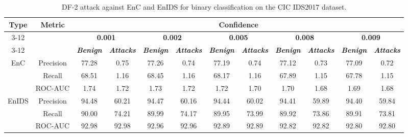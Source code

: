 \documentclass[conference]{IEEEtran}
\begin{document}
	\begin{table}[H]
		\caption{DF-2 attack against EnC and EnIDS for binary classification on the CIC IDS2017 dataset.}
		\small
		\setlength{\tabcolsep}{1pt}
		\centering
		\label{tab:cic_bin_df}
		
		\begin{tabular}{|c|c|c|c|c|c|c|c|c|c|c|c|}
			\hline
			\multirow{4}{*}{\textbf{Type}} & \multirow{4}{*}{\textbf{Metric}}& \multicolumn{10}{c|}{\textbf{Confidence}} \\
			\cline{3-12}
			&  & \multicolumn{2}{c|}{\textbf{0.001}} & \multicolumn{2}{c|}{\textbf{0.002}} & \multicolumn{2}{c|}{\textbf{0.005}} & \multicolumn{2}{c|}{\textbf{0.008}} & \multicolumn{2}{c|}{\textbf{0.009}}   \\
			\cline{3-12}
			&  &  \textbf{\textsl{Benign}} & \textbf{\textsl{Attacks}} & \textbf{\textsl{Benign}} & \textbf{\textsl{Attacks}} & \textbf{\textsl{Benign}} & \textbf{\textsl{Attacks}} & \textbf{\textsl{Benign}} & \textbf{\textsl{Attacks}} & \textbf{\textsl{Benign}} & \textbf{\textsl{Attacks}} \\
			\hline
			\multirow{3}{*}{EnC}& Precision & 77.28 & 0.75 & 77.26 & 0.74 & 77.19 & 0.74 & 77.12 & 0.73 & 77.09 & 0.72
			\\
			
			& Recall & 68.51 & 1.16 & 68.45 & 1.16 & 68.17 & 1.16 & 67.89 & 1.15 & 67.78 & 1.15
			\\
			
			& ROC-AUC & 1.74 & 1.72 & 1.73 & 1.72 & 1.72 & 1.70 & 1.70 & 1.68 & 1.69 & 1.68
			\\
			\hline
			\multirow{3}{*}{EnIDS} & Precision & \cellcolor{yellow!50}94.48 & \cellcolor{yellow!50}60.21 & \cellcolor{yellow!50}94.47 & \cellcolor{yellow!50}60.16 & \cellcolor{yellow!50}94.44 & \cellcolor{yellow!50}60.02 & \cellcolor{yellow!50}94.41 & \cellcolor{yellow!50}59.89 & \cellcolor{yellow!50}94.40 & \cellcolor{yellow!50}59.84
			\\
			
			& Recall & \cellcolor{yellow!50}90.00 & \cellcolor{yellow!50}74.21 & \cellcolor{yellow!50}89.99 & \cellcolor{yellow!50}74.17 & \cellcolor{yellow!50}89.95 & \cellcolor{yellow!50}73.99 & \cellcolor{yellow!50}89.92 & \cellcolor{yellow!50}73.86 & \cellcolor{yellow!50}89.91 & \cellcolor{yellow!50}73.81
			\\
			
			& ROC-AUC & \cellcolor{yellow!50}92.98 & \cellcolor{yellow!50}92.98 & \cellcolor{yellow!50}92.96 & \cellcolor{yellow!50}92.96 & \cellcolor{yellow!50}92.89 & \cellcolor{yellow!50}92.89 & \cellcolor{yellow!50}92.82 & \cellcolor{yellow!50}92.82 & \cellcolor{yellow!50}92.80 & \cellcolor{yellow!50}92.80
			\\
			\hline
		\end{tabular}
		
	\end{table}
	
\end{document}
